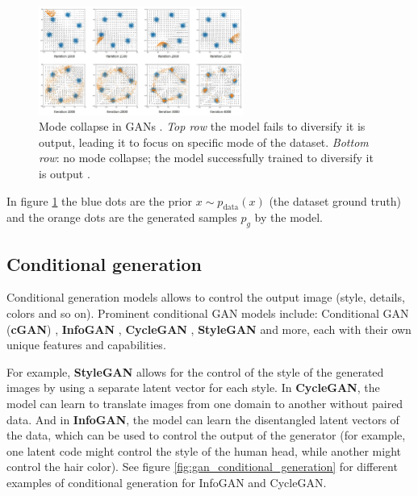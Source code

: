 \begin{figure}
    \centering
    \includegraphics[width=0.6\textwidth]{images/gan/gan_mode_collapse.png}
    \caption{Mode collapse in GANs \cite{gan_mode_collapse_image_source}. \textit{Top row} the model fails to diversify it is output, leading it to focus on specific mode of the dataset. \textit{Bottom row}: no mode collapse; the model successfully trained to diversify it is output \cite{gan_mode_collapse_image_source}.}
    \label{fig:gan_mode_collapse}
\end{figure}

In figure \ref{fig:gan_mode_collapse} the blue dots are the prior $x \sim p_{\text{data}}(x)$ (the dataset ground truth) and the orange dots are the generated samples $p_g$ by the model.




\subsection{Conditional generation}
\label{subsec:gan_conditional_generation}

Conditional generation models allows to control the output image (style, details, colors and so on). Prominent conditional GAN models include: Conditional GAN (\textbf{cGAN}) \cite{cgan}, \textbf{InfoGAN} \cite{infogan}, \textbf{CycleGAN} \cite{cyclegan}, \textbf{StyleGAN} \cite{stylegan} and more, each with their own unique features and capabilities. 

For example, \textbf{StyleGAN} allows for the control of the style of the generated images by using a separate latent vector for each style. In \textbf{CycleGAN}, the model can learn to translate images from one domain to another without paired data. And in \textbf{InfoGAN}, the model can learn the disentangled latent vectors of the data, which can be used to control the output of the generator (for example, one latent code might control the style of the human head, while another might control the hair color). See figure \ref{fig:gan_conditional_generation} for different examples of conditional generation for InfoGAN and CycleGAN.

